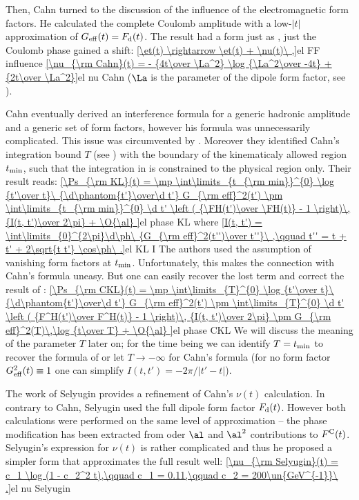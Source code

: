 Then, Cahn turned to the discussion of the influence of the electromagnetic form factors. He calculated the complete Coulomb amplitude with a low-$|t|$ approximation of $G_{\rm eff}(t) = F_{\rm d}(t)$. The result had a form just as , just the Coulomb phase gained a shift:
\eqref{\et(t) \rightarrow \et(t) + \nu(t)\ ,}{el FF influence}
\eqref{\nu_{\rm Cahn}(t) = - {4t\over \La^2} \log {\La^2\over -4t} + {2t\over \La^2}}{el nu Cahn}
($\La$ is the parameter of the dipole form factor, see ).

Cahn eventually derived an interference formula for a generic hadronic amplitude and a generic set of form factors, however his formula was unnecessarily complicated. This issue was circumvented by \KaL{} . Moreover they identified Cahn's integration bound $T$ (see ) with the boundary of the kinematicaly allowed region $t_{\rm min}$, such that the integration in  is constrained to the physical region only. Their result reads:
\eqref{\Ps_{\rm KL}(t) =
	\mp \int\limits_{t_{\rm min}}^{0} \log {t'\over t}\ {\d\phantom{t'}\over\d t'} G_{\rm eff}^2(t')
	\pm \int\limits_{t_{\rm min}}^{0} \d t' \left ( {\FH(t')\over \FH(t)} - 1 \right)\, {I(t, t')\over 2\pi}
	+ \O{\al}
}{el phase KL}
where
\eqref{I(t, t') = \int\limits_{0}^{2\pi}\d\ph\ {G_{\rm eff}^2(t'')\over t''}\ ,\qquad t'' = t + t' + 2\sqrt{t t'} \cos\ph\ .}{el KL I}
The authors used the assumption of vanishing form factors at $t_{\rm min}$. Unfortunately, this makes the connection with Cahn's formula  uneasy. But one can easily recover the lost term and correct the result of \KL{}:
\eqref{\Ps_{\rm CKL}(t) =
	\mp \int\limits_{T}^{0} \log {t'\over t}\ {\d\phantom{t'}\over\d t'} G_{\rm eff}^2(t')
	\pm \int\limits_{T}^{0} \d t' \left ( {F^H(t')\over F^H(t)} - 1 \right)\, {I(t, t')\over 2\pi}
	\pm G_{\rm eff}^2(T)\,\log {t\over T}
	+ \O{\al}
}{el phase CKL}
We will discuss the meaning of the parameter $T$ later on; for the time being we can identify $T = t_{\rm min}$ to recover the formula of \KL{} or let $T\to -\infty$ for Cahn's formula (for no form factor $G_{\rm eff}^2(t) \equiv 1$ one can simplify $I(t, t') = -2\pi / |t' - t|$).

The work of Selyugin  provides a refinement of Cahn's $\nu(t)$ calculation. In contrary to Cahn, Selyugin used the full dipole form factor $F_{\rm d}(t)$. However both calculations were performed on the same level of approximation -- the phase modification has been extracted from oder $\al$ and $\al^2$ contributions to $F^{\rm C}(t)$. Selyugin's expression for $\nu(t)$ is rather complicated and thus he proposed a simpler form that approximates the full result well:
\eqref{\nu_{\rm Selyugin}(t) = c_1 \log (1 - c_2^2 t),\qquad c_1 = 0.11,\qquad c_2 = 200\un{GeV^{-1}}\ .}{el nu Selyugin}

